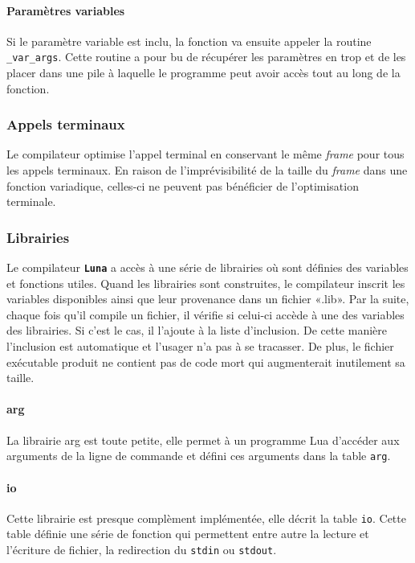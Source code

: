 \documentclass{article}
\newcommand{\luna}{\textbf{\texttt{Luna}}}
\begin{document}
\paragraph{Paramètres variables}
Si le paramètre variable est inclu, la fonction va ensuite appeler la routine \texttt{\_{}var\_{}args}. Cette routine a pour bu de récupérer les paramètres en trop et de les placer dans une pile à laquelle le programme peut avoir accès tout au long de la fonction.


\subsubsection{Appels terminaux}
Le compilateur optimise l'appel terminal en conservant le même \textit{frame} pour tous les appels terminaux. En raison de l'imprévisibilité de la taille du \textit{frame} dans une fonction variadique, celles-ci ne peuvent pas bénéficier de l'optimisation terminale.

\subsubsection{Librairies}
Le compilateur \luna{} a accès à une série de librairies où sont définies des variables et fonctions utiles. Quand les librairies sont construites, le compilateur inscrit les variables disponibles ainsi que leur provenance dans un fichier «.lib». Par la suite, chaque fois qu'il compile un fichier, il vérifie si celui-ci accède à une des variables des librairies. Si c'est le cas, il l'ajoute à la liste d'inclusion. De cette manière l'inclusion est automatique et l'usager n'a pas à se tracasser. De plus, le fichier exécutable produit ne contient pas de code mort qui augmenterait inutilement sa taille.

\paragraph{arg}
La librairie arg est toute petite, elle permet à un programme Lua d'accéder aux arguments de la ligne de commande et défini ces arguments dans la table \texttt{arg}.

\paragraph{io}
Cette librairie est presque complèment implémentée, elle décrit la table \texttt{io}. Cette table définie une série de fonction qui permettent entre autre la lecture et l'écriture de fichier, la redirection du \texttt{stdin} ou \texttt{stdout}.
\end{document}
